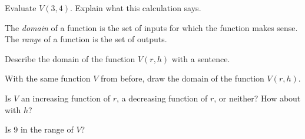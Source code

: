 \vspace{1.5in} 

\begin{ex}
    Evaluate $V(3,4)$. Explain what this calculation says.
\end{ex}

\vspace{1in}

\pagebreak 

\begin{defn}
    The \emph{domain} of a function is the set of inputs for which the function makes sense. The \emph{range} of a function is the set of outputs.
\end{defn}

\begin{ex}
    Describe the domain of the function $V(r,h)$ with a sentence.
\end{ex}

\vspace{1in}

\begin{ex}
    With the same function $V$ from before, draw the domain of the function $V(r,h)$.
\end{ex}

\vspace{1.3in}

\begin{ex}
    Is $V$ an increasing function of $r$, a decreasing function of $r$, or neither? How about with $h$?
\end{ex}

\vspace{.75in}

\begin{ex}
    Is 9 in the range of $V$?
\end{ex}

\vspace{.75in}

